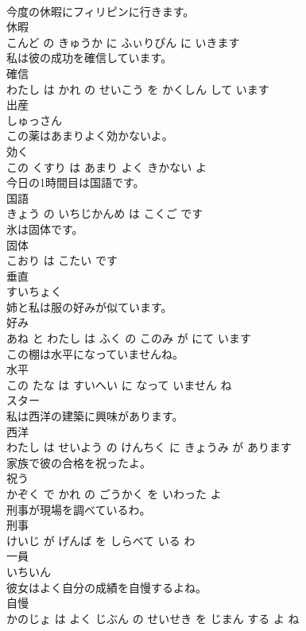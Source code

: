 \documentclass[8pt]{extreport}
\begin{document}
\begin{CJK}{UTF8}{min}
\\	今度の休暇にフィリピンに行きます。	
\\	休暇 
\\	こんど の きゅうか に ふぃりぴん に いきます			
\\	私は彼の成功を確信しています。	
\\	確信 
\\	わたし は かれ の せいこう を かくしん して います			
\\	出産	
\\	しゅっさん			
\\	この薬はあまりよく効かないよ。	
\\	効く 
\\	この くすり は あまり よく きかない よ			
\\	今日の1時間目は国語です。	
\\	国語 
\\	きょう の いちじかんめ は こくご です			
\\	氷は固体です。	
\\	固体 
\\	こおり は こたい です			
\\	垂直	
\\	すいちょく			
\\	姉と私は服の好みが似ています。	
\\	好み 
\\	あね と わたし は ふく の このみ が にて います			
\\	この棚は水平になっていませんね。	
\\	水平 
\\	この たな は すいへい に なって いません ね			
\\	スター	
\\	私は西洋の建築に興味があります。	
\\	西洋 
\\	わたし は せいよう の けんちく に きょうみ が あります			
\\	家族で彼の合格を祝ったよ。	
\\	祝う 
\\	かぞく で かれ の ごうかく を いわった よ			
\\	刑事が現場を調べているわ。	
\\	刑事 
\\	けいじ が げんば を しらべて いる わ			
\\	一員	
\\	いちいん			
\\	彼女はよく自分の成績を自慢するよね。	
\\	自慢 
\\	かのじょ は よく じぶん の せいせき を じまん する よ ね			

\end{CJK}
\end{document}
